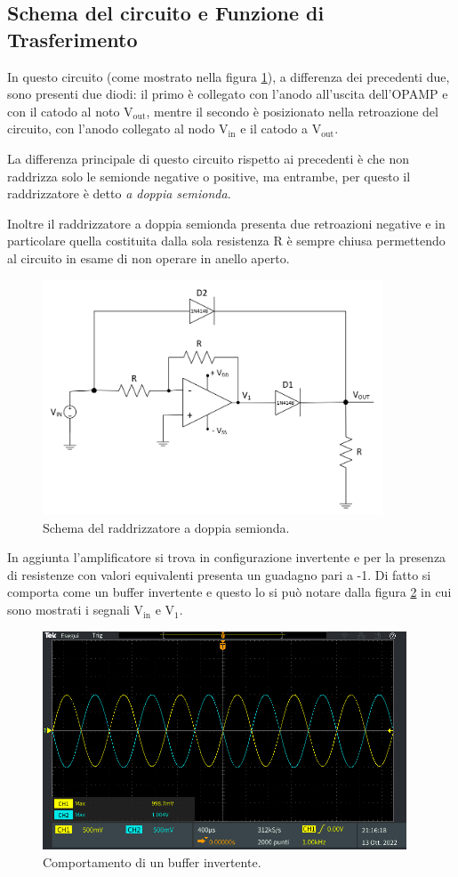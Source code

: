 \documentclass{report}
\begin{document}
\subsection{Schema del circuito e Funzione di Trasferimento}
In questo circuito (come mostrato nella figura \ref{figura:schema3}), a differenza dei precedenti due, sono presenti due diodi: il primo è collegato con l'anodo all'uscita dell'OPAMP e con il catodo al noto $\displaystyle\mathrm{V_{out}}$, mentre il secondo è posizionato nella retroazione del circuito, con l'anodo collegato al nodo $\displaystyle\mathrm{V_{in}}$ e il catodo a $\displaystyle\mathrm{V_{out}}$.\par
La differenza principale di questo circuito rispetto ai precedenti è che non raddrizza solo le semionde negative o positive, ma entrambe, per questo il raddrizzatore è detto \textit{a doppia semionda}. \par
Inoltre il raddrizzatore a doppia semionda presenta due retroazioni negative e in particolare quella costituita dalla sola resistenza R è sempre chiusa permettendo al circuito in esame di non operare in anello aperto.\par
\begin{figure}[h]
	\centering
	\includegraphics[height=7cm]{immagini/schema3}
	\caption{Schema del raddrizzatore a doppia semionda.}
	\label{figura:schema3}
\end{figure}
In aggiunta l'amplificatore si trova in configurazione invertente e per la presenza di resistenze con valori equivalenti presenta un guadagno pari a -1. Di fatto si comporta come un buffer invertente e questo lo si può notare dalla figura \ref{figura:TEK00023} in cui sono mostrati i segnali $\displaystyle\mathrm{V_{in}}$ e $\displaystyle\mathrm{V_{1}}$.
\begin{figure}[h]
	\centering
	\includegraphics[height=6.5cm]{immagini/TEK00023}
	\caption{Comportamento di un buffer invertente.}
	\label{figura:TEK00023}
\end{figure}
\end{document}
